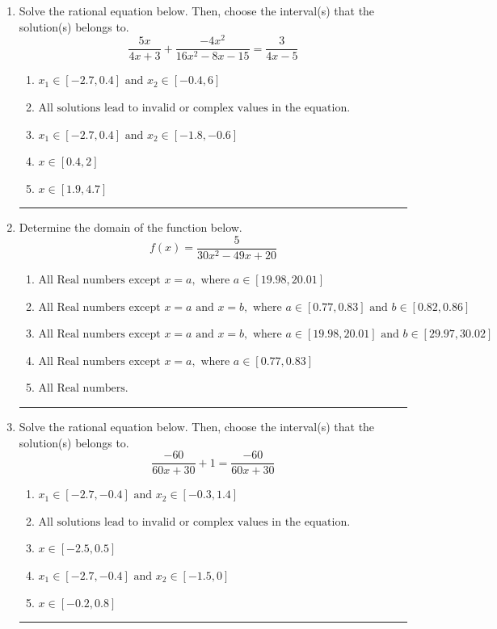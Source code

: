 \documentclass[14pt]{extbook}
\newcommand{\litem}[1]{\item#1\hspace*{-1cm}\rule{\textwidth}{0.4pt}}
\begin{document}
\begin{enumerate}
\litem{
Solve the rational equation below. Then, choose the interval(s) that the solution(s) belongs to.\[ \frac{5x}{4x + 3} + \frac{-4x^{2}}{16x^{2} -8 x -15} = \frac{3}{4x -5} \]\begin{enumerate}[label=\Alph*.]
\item \( x_1 \in [-2.7, 0.4] \text{ and } x_2 \in [-0.4,6] \)
\item \( \text{All solutions lead to invalid or complex values in the equation.} \)
\item \( x_1 \in [-2.7, 0.4] \text{ and } x_2 \in [-1.8,-0.6] \)
\item \( x \in [0.4,2] \)
\item \( x \in [1.9,4.7] \)

\end{enumerate} }
\litem{
Determine the domain of the function below.\[ f(x) = \frac{5}{30x^{2} -49 x + 20} \]\begin{enumerate}[label=\Alph*.]
\item \( \text{All Real numbers except } x = a, \text{ where } a \in [19.98, 20.01] \)
\item \( \text{All Real numbers except } x = a \text{ and } x = b, \text{ where } a \in [0.77, 0.83] \text{ and } b \in [0.82, 0.86] \)
\item \( \text{All Real numbers except } x = a \text{ and } x = b, \text{ where } a \in [19.98, 20.01] \text{ and } b \in [29.97, 30.02] \)
\item \( \text{All Real numbers except } x = a, \text{ where } a \in [0.77, 0.83] \)
\item \( \text{All Real numbers.} \)

\end{enumerate} }
\litem{
Solve the rational equation below. Then, choose the interval(s) that the solution(s) belongs to.\[ \frac{-60}{60x + 30} + 1 = \frac{-60}{60x + 30} \]\begin{enumerate}[label=\Alph*.]
\item \( x_1 \in [-2.7, -0.4] \text{ and } x_2 \in [-0.3,1.4] \)
\item \( \text{All solutions lead to invalid or complex values in the equation.} \)
\item \( x \in [-2.5,0.5] \)
\item \( x_1 \in [-2.7, -0.4] \text{ and } x_2 \in [-1.5,0] \)
\item \( x \in [-0.2,0.8] \)


\end{enumerate}}
\end{enumerate}
\end{document}

